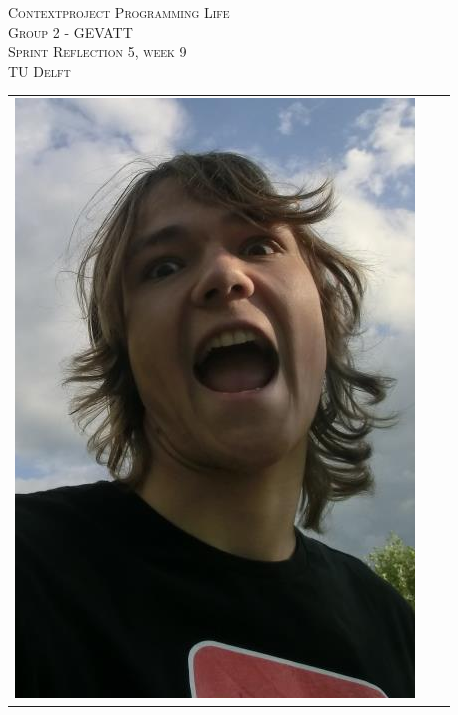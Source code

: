 \begin{titlepage}
\begin{center}
\textsc{\LARGE Contextproject Programming Life}\\
\vspace{10pt}
\textsc{\LARGE Group 2 - GEVATT}\\
\vspace{10pt}
\textsc{\LARGE Sprint Reflection 5, week 9}\\
\vspace{10pt}
\textsc{\large TU Delft}

\begin{table}[ht]
\centering
\begin{tabular}{ccc}
\includegraphics[scale=0.2]{../photos/ruben.png}   &

\end{tabular}
\end{table}
\end{center}
\end{titlepage}
